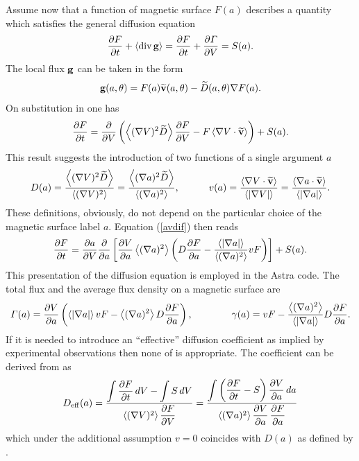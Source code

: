 Assume now that a function of magnetic surface $F(a)$ describes a
quantity which satisfies the general diffusion equation 
\begin{equation}\label{dif1}
\displaystyle{\partial F\over\partial t}+\left<\mbox{div}\,{\bf g}\right>
=\displaystyle{\partial F\over\partial t}+\displaystyle{\partial \mit\Gamma\over\partial V}
=S(a)
.\end{equation}
The local flux ${\bf g}$ can be taken in the form
\begin{equation}\label{Gloc}
{\bf g}(a,\theta)
=F(a)\widetilde{\bf v}(a,\theta)-\widetilde D(a,\theta)\nabla F(a)
.\end{equation}
On substitution in  one has
\begin{equation}\label{avdif}
\displaystyle{\partial F\over\partial t}
=\displaystyle{\partial \over\partial V}\left( \left<(\nabla V)^2 \widetilde D\right>\displaystyle{\partial F\over\partial V} - F\left<\nabla
V\cdot\widetilde{\bf v}\right> \right) 
+S(a)
.\end{equation}
This result suggests the introduction of two functions of a single
argument $a$ 
\begin{equation}\label{Dv}
D(a)
=\frac{\av{(\na V)^2 \widetilde D}}{\av{(\na V)^2}}
=\frac{\av{(\na a)^2 \widetilde D}}{\av{(\na a)^2}}
,\qquad\quad
v(a)
=\frac{\av{\na V\.\widetilde{\bf v}}}{\av{|\na V|}}
=\frac{\av{\na a\.\widetilde{\bf v}}}{\av{|\na a|}}
.\end{equation}
These definitions, obviously, do not depend on the particular choice of
the magnetic surface label $a.$ 
Equation (\ref{avdif}) then reads
\begin{equation}\label{dif}
\prti{F}{t}
=\prti{a}{V}\prti{}{a}\lb[\prti{V}{a}\av{(\na a)^2}
\lb(D\prti{F}{a} - \frac{\av{|\na a|}}{\av{(\na a)^2}} v F\rb)
\rb]+S(a)
.\end{equation}
This presentation of the diffusion equation is employed in the Astra code.
The total flux and the average flux density on a magnetic surface are
\begin{equation}\label{Gamma}
{\mit\Gamma}(a)
=\prti{V}{a}
\lb(\av{|\na a|} v F - \av{(\na a)^2}D\prti{F}{a} \rb)
,\qquad\qquad
\gamma(a)
=v F - \frac{\av{(\na a)^2}}{\av{|\na a|}}D\prti{F}{a} 
.\end{equation}
If it is needed to introduce an ``effective'' diffusion coefficient as
implied by experimental observations then none of  is
appropriate. 
The coefficient can be derived from  as
\begin{equation}\label{Deff}
D_{\rm eff}(a)
=\frac{\displaystyle\int\displaystyle{\partial F\over\partial t}\,dV-\int S\,dV}
{\left<(\nabla V)^2\right>\displaystyle{\partial F\over\partial V}}
=\frac{\displaystyle\int\left(\displaystyle{\partial F\over\partial t}-S\right)\displaystyle{\partial V\over\partial a}\,da}
{\left<(\nabla a)^2\right>\displaystyle{\partial V\over\partial a}\,\displaystyle{\partial F\over\partial a}}
\end{equation}
which under the additional assumption $v=0$ coincides with $D(a)$ as
defined by . 

